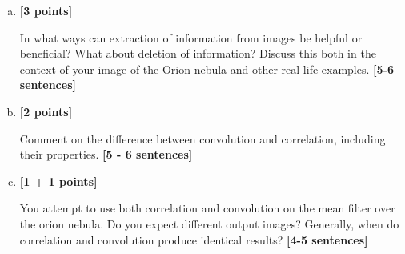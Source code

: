 \documentclass[11pt]{article}
\begin{document}
\begin{enumerate}[(a)]

    \item \textbf{[3 points]} 
    \begin{tcolorbox}[colback=orange!5!white,colframe=orange!75!black]
    In what ways can extraction of information from images be helpful or beneficial? What about deletion of information? Discuss this both in the context of your image of the Orion nebula and other real-life examples. \textbf{[5-6 sentences]}
    \end{tcolorbox}
    

    \item \textbf{[2 points]} 
    \begin{tcolorbox}[colback=orange!5!white,colframe=orange!75!black]
    Comment on the difference between convolution and correlation, including their properties. \textbf{[5 - 6 sentences]}
    \end{tcolorbox}
    

    \pagebreak
    \item \textbf{[1 + 1 points]} 
    \begin{tcolorbox}[colback=orange!5!white,colframe=orange!75!black]
    You attempt to use both correlation and convolution on the mean filter over the orion nebula. Do you expect different output images? Generally, when do correlation and convolution produce identical results? \textbf{[4-5 sentences]}
    \end{tcolorbox}
    

\end{enumerate}
\end{document}
